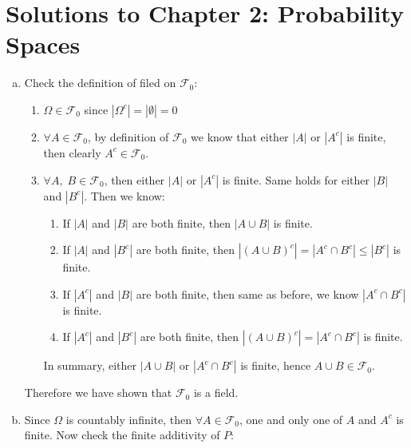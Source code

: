 \section{Solutions to Chapter 2: Probability Spaces}
\label{sec:solutions-chapter-2}

\setcounter{Lcount}{0}
\begin{list}{2.6.}{}
\item
  \begin{enumerate}[(a)]
  \item Check the definition of filed on $\mathcal{F}_0$:
    \begin{enumerate}[(1)]
    \item $\Omega\in\mathcal{F}_0$ since $\left|\Omega^c\right| = \left|\emptyset\right| = 0 $
    \item $\forall A \in \mathcal{F}_0$, by definition of $\mathcal{F}_0$ we know that either $\left|A\right|$ or $\left|A^c\right|$ is finite, then clearly $A^c\in\mathcal{F}_0$.
    \item $\forall A,\;B\in\mathcal{F}_0$, then either $\left|A\right|$ or $\left|A^c\right|$ is finite. Same holds for either $\left|B\right|$ and $\left|B^c\right|$. Then we know:
      \begin{enumerate}[3.1]
      \item If $\left|A\right|$ and $\left|B\right|$ are both finite, then $\left|A\cup B\right|$ is finite.
      \item If $\left|A\right|$ and $\left|B^c\right|$ are both finite, then
        $
          \left|\left(A\cup B\right)^c\right| = \left|A^c\cap B^c\right| \leq \left|B^c\right|
        $ is finite.
      \item If $\left|A^c\right|$ and $\left| B\right|$ are both finite, then same as before, we know $\left|A^c\cap B^c\right| $ is finite.
      \item If $\left|A^c\right|$ and $\left|B^c\right|$ are both finite, then
        $
          \left|\left(A\cup B\right)^c\right| = \left|A^c\cap B^c\right|
        $ is finite.
      \end{enumerate}
      In summary, either $\left|A\cup B\right|$ or $\left|A^c\cap B^c\right|$ is finite, hence $A\cup B\in\mathcal{F}_0$.
    \end{enumerate}
    Therefore we have shown that $\mathcal{F}_0$ is a field.
  \item Since $\Omega$ is countably infinite, then $\forall A\in\mathcal{F}_0$, one and only one of $A$ and $A^c$ is finite. Now check the finite additivity of $P$:

\end{enumerate}
\end{list}
